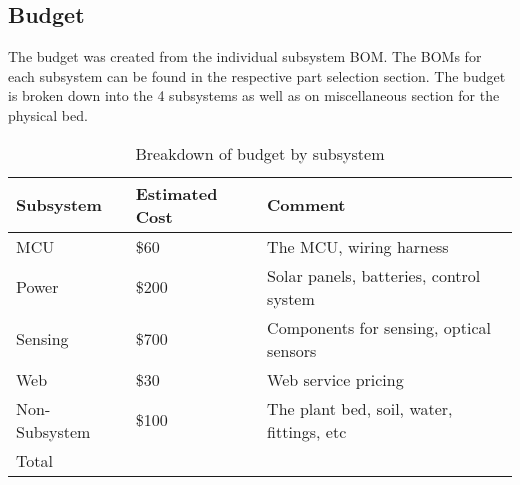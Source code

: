 \subsection{Budget}
The budget was created from the individual subsystem BOM. The BOMs for each subsystem can be found in the respective part selection section. The budget is broken down into the 4 subsystems as well as on miscellaneous section for the physical bed. 
\begin{table}[H]
    \centering
    \begin{tabularx}{.8\textwidth}
        {
            | >{\raggedright\arraybackslash}X
            | >{\raggedright\arraybackslash}X
            | >{\raggedleft\arraybackslash}X
            |
        }
        \caption{Breakdown of budget by subsystem}\\
        \hline
        Subsystem & Estimated Cost & Comment \\
        \hline
        MCU & \$60 & The MCU, wiring harness \\         %
        \hline
        Power & \$200 & Solar panels, batteries, control system \\
        \hline
        Sensing & \$700 & Components for sensing, optical sensors \\ %
        \hline
        Web & \$30 & Web service pricing \\             %
        \hline
        Non-Subsystem & \$100 & The plant bed, soil, water, fittings, etc \\
        \hline
        Total & \multicolumn{2}{|c|}{\$1090}\\           %
        \hline
    \end{tabularx}
\end{table}
